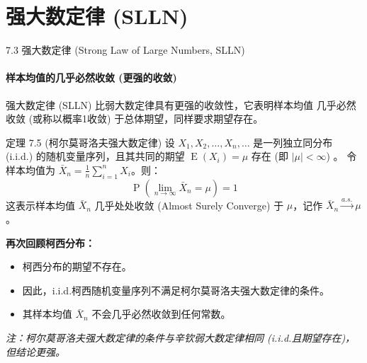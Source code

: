 \documentclass[UTF8]{beamer}
\DeclareMathOperator{\E}{\operatorname{E}}
\DeclareMathOperator{\Prob}{\operatorname{P}}
\begin{document}
\section{强大数定律 (SLLN)}
\begin{frame}[shrink=10]{7.3 强大数定律 (Strong Law of Large Numbers, SLLN)}
    \framesubtitle{样本均值的几乎必然收敛 (更强的收敛)}
    强大数定律 (SLLN) 比弱大数定律具有更强的收敛性，它表明样本均值 \alert{几乎必然收敛} (或称以概率1收敛) 于总体期望，同样要求期望存在。
    \vspace{0.3cm}

    \begin{block}{定理 7.5 (柯尔莫哥洛夫强大数定律)} %
        设 $X_1, X_2, \dots, X_n, \dots$ 是一列\alert{独立同分布 (i.i.d.)} 的随机变量序列，且其共同的期望 $\E(X_i) = \mu$ \alert{存在} (即 $|\mu| < \infty$) 。
        令样本均值为 $\bar{X}_n = \frac{1}{n} \sum_{i=1}^{n} X_i$。则：
        \[ \Prob\left( \lim_{n \to \infty} \bar{X}_n = \mu \right) = 1 \]
        这表示样本均值 $\bar{X}_n$ \alert{几乎处处收敛} (Almost Surely Converge) 于 $\mu$，记作 $\bar{X}_n \xrightarrow{a.s.} \mu$。
    \end{block}
    \vspace{0.3cm}
    \textbf{再次回顾柯西分布：}
    \begin{itemize}
        \item 柯西分布的期望\alert{不存在}。
        \item 因此，i.i.d.柯西随机变量序列\alert{不满足}柯尔莫哥洛夫强大数定律的条件。
        \item 其样本均值 $\bar{X}_n$ \alert{不会}几乎必然收敛到任何常数。
    \end{itemize}
    \footnotesize
    \textit{注：柯尔莫哥洛夫强大数定律的条件与辛钦弱大数定律相同 (i.i.d.且期望存在)，但结论更强。}
\end{frame}
\end{document}
